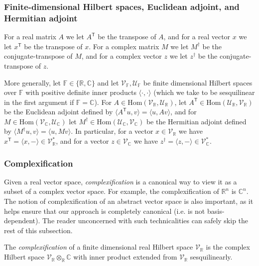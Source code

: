 \documentclass[11pt]{article}
\numberwithin{theorem}{section}
\theoremstyle{definition}
\renewcommand{\t}{{\scriptscriptstyle\mathsf{T}}}
\newcommand{\ip}[2]{\langle #1 , #2\rangle}
\newcommand{\setft}[1]{\mathrm{#1}}
\newcommand{\complex}{\mathbb{C}}
\newcommand{\field}{\mathbb{F}}
\newcommand{\real}{\mathbb{R}}
\newcommand\V{\mathcal{V}}
\newcommand\U{\mathcal{U}}
\newcommand{\Hom}{\setft{Hom}}
\newcommand{\dg}{\dagger}
\newcommand{\Vc}{\V_{\complex}}
\newcommand{\Vr}{\V_{\real}}
\begin{document}
\subsubsection*{Finite-dimensional Hilbert spaces, Euclidean adjoint, and Hermitian adjoint}

For a real matrix $A$ we let $A^\t$ be the transpose of $A$, and for a real vector $x$ we let $x^\t$ be the transpose of $x$. For a complex matrix $M$ we let $M^{\dg}$ be the conjugate-transpose of $M$, and for a complex vector $z$ we let $z^{\dg}$ be the conjugate-transpose of $z$.

More generally, let $\field\in \{\real,\complex\}$ and let $\V_{\field}, \U_{\field}$ be finite dimensional Hilbert spaces over $\field$ with positive definite inner products $\ip{\cdot}{\cdot}$ (which we take to be sesquilinear in the first argument if $\field=\complex$). For $A \in \Hom(\Vr,\U_{\real})$, let  $A^{\t} \in \Hom(\U_{\real},\Vr)$ be the Euclidean adjoint defined by $\ip{A^\t u}{v}=\ip{u}{Av}$, and for $M \in \Hom(\Vc,\U_{\complex})$ let $M^{\dg} \in \Hom(\U_{\complex},\Vc)$ be the Hermitian adjoint defined by $\ip{M^{\dg} u}{v}=\ip{u}{M v}$. In particular, for a vector $x\in \Vr$ we have $x^{\t}=\ip{x}{-}\in\Vr^*$, and for a vector $z \in \Vc$ we have $z^{\dg}=\ip{z}{-}\in \Vc^*$.


\subsubsection*{Complexification}

Given a real vector space, \textit{complexification} is a canonical way to view it as a subset of a complex vector space. For example, the complexification of $\real^n$ is $\complex^n$. The notion of complexification of an abstract vector space is also important, as it helps ensure that our approach is completely canonical (i.e. is not basis-dependent). The reader unconcerned with such technicalities can safely skip the rest of this subsection.

The \textit{complexification} of a finite dimensional real Hilbert space $\Vr$ is the complex Hilbert space $\Vr \otimes_{\real} \complex$ with inner product extended from $\Vr$ sesquilinearly.
\end{document}
